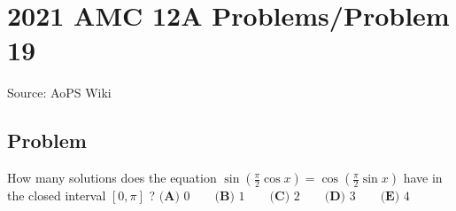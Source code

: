 \documentclass[12pt]{article}
\begin{document}
\section*{{2021 AMC 12A Problems/Problem 19}}
Source: AoPS Wiki

\subsection*{Problem}
How many solutions does the equation $\sin \left( \frac{\pi}2 \cos x\right)=\cos \left( \frac{\pi}2 \sin x\right)$ have in the closed interval $[0,\pi]$ ? $\textbf{(A) }0 \qquad \textbf{(B) }1 \qquad \textbf{(C) }2 \qquad \textbf{(D) }3\qquad \textbf{(E) }4$
\end{document}

